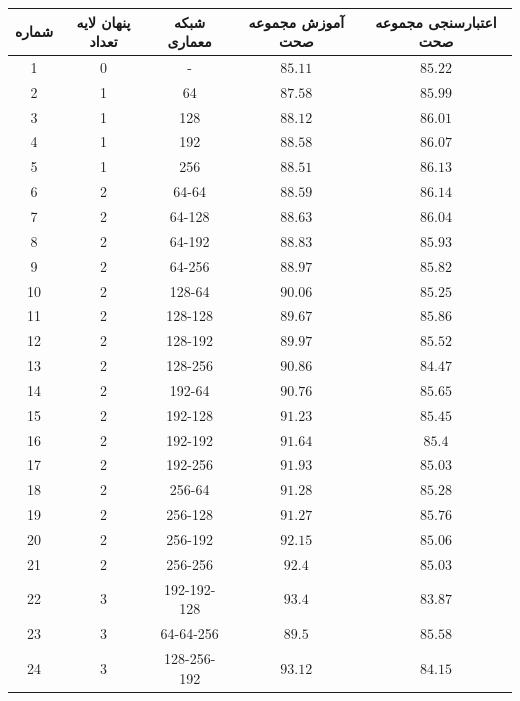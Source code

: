 \documentclass{article}
\begin{document}
    \begin{longtable}{|c|c|c|c|c|}
        \hline
        شماره             & پنهان لایه تعداد & شبکه معماری & آموزش مجموعه صحت & اعتبارسنجی مجموعه صحت \\ \hline
        1 & 0 &  - & $85.11$ & $85.22$ \\ \hline
        2 & 1 &  64 & $87.58$ & $85.99$ \\ \hline
        3 & 1 &  128 & $88.12$ & $86.01$ \\ \hline
        4 & 1 &  192 & $88.58$ & $86.07$ \\ \hline
        5 & 1 &  256 & $88.51$ & $86.13$ \\ \hline
        6 & 2 &  64-64 & $88.59$ & $86.14$ \\ \hline
        7 & 2 &  64-128 & $88.63$ & $86.04$ \\ \hline
        8 & 2 &  64-192 & $88.83$ & $85.93$ \\ \hline
        9 & 2 &  64-256 & $88.97$ & $85.82$ \\ \hline
        10 & 2 &  128-64 & $90.06$ & $85.25$ \\ \hline
        11 & 2 &  128-128 & $89.67$ & $85.86$ \\ \hline
        12 & 2 &  128-192 & $89.97$ & $85.52$ \\ \hline
        13 & 2 &  128-256 & $90.86$ & $84.47$ \\ \hline
        14 & 2 &  192-64 & $90.76$ & $85.65$ \\ \hline
        15 & 2 &  192-128 & $91.23$ & $85.45$ \\ \hline
        16 & 2 &  192-192 & $91.64$ & $85.4$ \\ \hline
        17 & 2 &  192-256 & $91.93$ & $85.03$ \\ \hline
        18 & 2 &  256-64 & $91.28$ & $85.28$ \\ \hline
        19 & 2 &  256-128 & $91.27$ & $85.76$ \\ \hline
        20 & 2 &  256-192 & $92.15$ & $85.06$ \\ \hline
        21 & 2 &  256-256 & $92.4$ & $85.03$ \\ \hline
        22 & 3 &  192-192-128 & $93.4$ & $83.87$ \\ \hline
        23 & 3 &  64-64-256 & $89.5$ & $85.58$ \\ \hline
        24 & 3 &  128-256-192 & $93.12$ & $84.15$ \\ \hline

\end{longtable}
\end{document}
